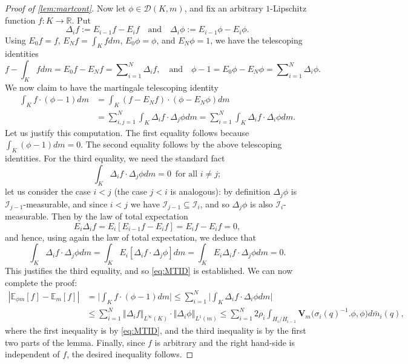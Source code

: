 \documentclass{amsart}
\numberwithin{equation}{subsection}
\theoremstyle{plain}
\theoremstyle{definition}
\theoremstyle{plain}
\begin{document}
\begin{proof}[Proof of \cref{lem:martcont}]
Now let \(\phi\in\mathcal{D}\left(K,m\right)\), and fix an arbitrary \(1\)-Lipschitz function \(f:K\to\mathbb{R}\). Put
\[\Delta_{i}f:=E_{i-1}f-E_{i}f\quad\text{and}\quad\Delta_{i}\phi:=E_{i-1}\phi-E_{i}\phi.\]
Using \(E_{0}f=f\), \(E_{N}f=\int_{K}fdm\), \(E_{0}\phi=\phi\), and \(E_{N}\phi=1\), we have the telescoping identities
\[f-\int_{K}fdm=E_{0}f-E_{N}f=\sum\nolimits_{i=1}^{N}\Delta_{i}f,\quad\text{and}\quad\phi-1=E_{0}\phi-E_{N}\phi=\sum\nolimits_{i=1}^{N}\Delta_{i}\phi.\]
We now claim to have the martingale telescoping identity
\begin{equation}
\begin{aligned}
\int_{K}f\cdot\left(\phi-1\right)dm
&=\int_{K}\left(f-E_{N}f\right)\cdot\left(\phi-E_{N}\phi\right)dm\\
&=\sum\nolimits_{i,j=1}^{N}\int_{K}\Delta_{i}f\cdot\Delta_{j}\phi dm=\sum\nolimits_{i=1}^{N}\int_{K}\Delta_{i}f\cdot\Delta_{i}\phi dm.
\end{aligned}\label{eq:MTID}
\end{equation}
Let us justify this computation. The first equality follows because \(\int_{K}\left(\phi-1\right)dm=0\). The second equality follows by the above telescoping identities. For the third equality, we need the standard fact
\[\int_{K}\Delta_{i}f\cdot\Delta_{j}\phi dm=0\,\text{ for all }i\neq j;\]
let us consider the case \(i<j\) (the case \(j<i\) is analogous): by definition \(\Delta_{j}\phi\) is \(\mathcal{I}_{j-1}\)-measurable, and since \(i<j\) we have \(\mathcal{I}_{j-1}\subseteq\mathcal{I}_{i}\), and so \(\Delta_{j}\phi\) is also \(\mathcal{I}_{i}\)-measurable. Then by the law of total expectation
\[E_{i}\Delta_{i}f=E_{i}\left[E_{i-1}f-E_{i}f\right]=E_{i}f-E_{i}f=0,\]
and hence, using again the law of total expectation, we deduce that
\[\int_{K}\Delta_{i}f\cdot\Delta_{j}\phi dm=\int_{K}E_{i}\left[\Delta_{i}f\cdot\Delta_{j}\phi\right]dm=\int_{K}E_{i}\Delta_{i}f\cdot\Delta_{j}\phi dm=0.\]
This justifies the third equality, and so \eqref{eq:MTID} is established. We can now complete the proof:
\begin{align*}
\left|\mathbb{E}_{\phi m}\left[f\right]-\mathbb{E}_{m}\left[f\right]\right|	
&=\Big|\int_{K}f\cdot\left(\phi-1\right)dm\Big|\leq\sum\nolimits_{i=1}^{N}\Big|\int_{K}\Delta_{i}f\cdot\Delta_{i}\phi dm\Big|\\
&\leq\sum\nolimits_{i=1}^{N}\left\Vert\Delta_{i}f\right\Vert_{L^{\infty}\left(K\right)}\cdot\left\Vert\Delta_{i}\phi\right\Vert_{L^{1}\left(m\right)}\leq\sum\nolimits_{i=1}^{N}2\rho_{i}\int_{H_{i}/H_{i-1}}\mathbf{V}_{m}\big(\sigma_{i}\left(q\right)^{-1}.\phi,\phi\big)d\bar{m}_{i}\left(q\right),
\end{align*}
where the first inequality is by \eqref{eq:MTID}, and the third inequality is by the first two parts of the lemma. Finally, since \(f\) is arbitrary and the right hand-side is independent of \(f\), the desired inequality follows.
\end{proof}
\end{document}
